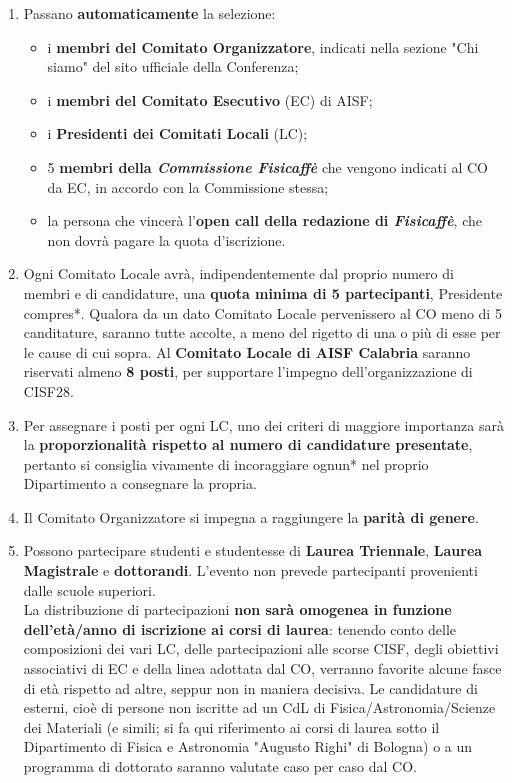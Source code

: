 \documentclass[12pt,a4paper]{article}
\begin{document}
\begin{enumerate}[topsep=5pt,itemsep=11pt,parsep=8pt]
  \item Passano \textbf{automaticamente} la selezione:
  \begin{itemize}[topsep=4pt,itemsep=4pt,parsep=0pt]
    \item i \textbf{membri del Comitato Organizzatore}, indicati nella sezione "Chi siamo" del sito ufficiale della Conferenza;
    \item i \textbf{membri del Comitato Esecutivo} (EC) di AISF;
    \item i \textbf{Presidenti dei Comitati Locali} (LC);
    \item 5 \textbf{membri della \textit{Commissione Fisicaffè}} che vengono indicati al CO da EC, in accordo con la Commissione stessa;
    \item la persona che vincerà l'\textbf{open call della redazione di \textit{Fisicaffè}}, che non dovrà pagare la quota d'iscrizione.
  \end{itemize}

  \item Ogni Comitato Locale avrà, indipendentemente dal proprio numero di membri e di candidature, una \textbf{quota minima di 5 partecipanti}, Presidente compres*. Qualora da un dato Comitato Locale pervenissero al CO meno di 5 canditature, saranno tutte accolte, a meno del rigetto di una o più di esse per le cause di cui sopra. Al \textbf{Comitato Locale di AISF Calabria} saranno riservati almeno \textbf{8 posti}, per supportare l'impegno dell'organizzazione di CISF28.

  \item Per assegnare i posti per ogni LC, uno dei criteri di maggiore importanza sarà la \textbf{proporzionalità rispetto al numero di candidature presentate}, pertanto si consiglia vivamente di incoraggiare ognun* nel proprio Dipartimento a consegnare la propria.

  \item Il Comitato Organizzatore si impegna a raggiungere la \textbf{parità di genere}.

  \item Possono partecipare studenti e studentesse di \textbf{Laurea Triennale}, \textbf{Laurea Magistrale} e \textbf{dottorandi}. L'evento non prevede partecipanti provenienti dalle scuole superiori.\\
  La distribuzione di partecipazioni \textbf{non sarà omogenea in funzione dell'età/anno di iscrizione ai corsi di laurea}: tenendo conto delle composizioni dei vari LC, delle partecipazioni alle scorse CISF, degli obiettivi associativi di EC e della linea adottata dal CO, verranno favorite alcune fasce di età rispetto ad altre, seppur non in maniera decisiva. Le candidature di esterni, cioè di persone non iscritte ad un CdL di Fisica/Astronomia/Scienze dei Materiali (e simili; si fa qui riferimento ai corsi di laurea sotto il Dipartimento di Fisica e Astronomia "Augusto Righi" di Bologna) o a un programma di dottorato saranno valutate caso per caso dal CO.


\end{enumerate}
\end{document}
